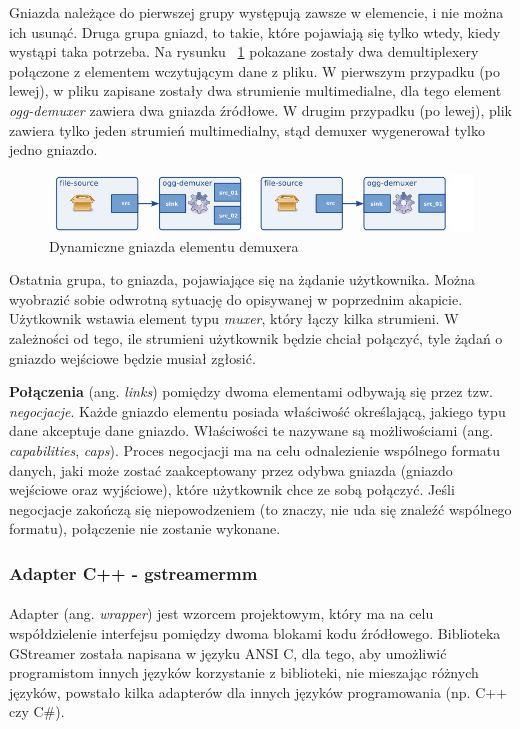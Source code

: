 \documentclass[12pt]{article}
\begin{document}
Gniazda należące do pierwszej grupy występują zawsze w elemencie, i nie można ich usunąć.
Druga grupa gniazd, to takie, które pojawiają się tylko wtedy, kiedy wystąpi taka potrzeba. Na rysunku ~\ref{fig:requestPadsDemux} pokazane zostały dwa demultiplexery połączone z elementem wczytującym dane z pliku. W pierwszym przypadku (po lewej), w pliku zapisane zostały dwa strumienie multimedialne, dla tego element \textit{ogg-demuxer} zawiera dwa gniazda źródłowe. W drugim przypadku (po lewej), plik zawiera tylko jeden strumień multimedialny, stąd demuxer wygenerował tylko jedno gniazdo.
\begin{figure}[H]
  \includegraphics[width=150mm]{img/request-pads-demux.png}
  \caption{Dynamiczne gniazda elementu demuxera \cite{gstmainpage}}
  \label{fig:requestPadsDemux}
\end{figure}
Ostatnia grupa, to gniazda, pojawiające się na żądanie użytkownika. Można wyobrazić sobie odwrotną sytuację do opisywanej w poprzednim akapicie. Użytkownik wstawia element typu \textit{muxer}, który łączy kilka strumieni. W zależności od tego, ile strumieni użytkownik będzie chciał połączyć, tyle żądań o gniazdo wejściowe będzie musiał zgłosić.

\textbf{Połączenia} (ang. \textit{links}) pomiędzy dwoma elementami odbywają się przez tzw. \textit{negocjacje}. Każde gniazdo elementu posiada właściwość określającą, jakiego typu dane akceptuje dane gniazdo. Właściwości te nazywane są możliwościami (ang. \textit{capabilities}, \textit{caps}). Proces negocjacji ma na celu odnalezienie wspólnego formatu danych, jaki może zostać zaakceptowany przez odybwa gniazda (gniazdo wejściowe oraz wyjściowe), które użytkownik chce ze sobą połączyć. Jeśli negocjacje zakończą się niepowodzeniem (to znaczy, nie uda się znaleźć wspólnego formatu), połączenie nie zostanie wykonane.

\subsubsection{Adapter C++ - gstreamermm}
\paragraph{}
Adapter (ang. \textit{wrapper}) jest wzorcem projektowym, który ma na celu współdzielenie interfejsu pomiędzy dwoma blokami kodu źródłowego. Biblioteka GStreamer została napisana w języku ANSI C, dla tego, aby umożliwić programistom innych języków korzystanie z biblioteki, nie mieszając różnych języków, powstało kilka adapterów dla innych języków programowania (np. C++ czy C\#).
\end{document}
